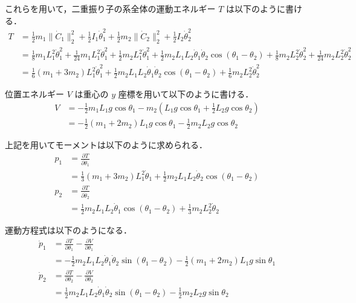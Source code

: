 これらを用いて，二重振り子の系全体の運動エネルギー $T$ は以下のように書ける．
\begin{align}
    T
     & = \frac{1}{2} m_1 \|\dot{C}_1\|_2^2
    + \frac{1}{2} I_1 \dot{\theta}_1^2
    + \frac{1}{2} m_2 \|\dot{C}_2\|_2^2
    + \frac{1}{2} I_2 \dot{\theta}_2^2
    \\
     & = \frac{1}{8} m_1 L_1^2 \dot{\theta}_1^2
    + \frac{1}{24} m_1 L_1^2 \dot{\theta}_1^2
    + \frac{1}{2} m_2 L_1^2 \dot{\theta}_1^2
    + \frac{1}{2} m_2 L_1 L_2 \dot{\theta}_1 \dot{\theta}_2 \cos(\theta_1 - \theta_2)
    + \frac{1}{8} m_2 L_2^2 \dot{\theta}_2^2
    + \frac{1}{24} m_2 L_2^2 \dot{\theta}_2^2
    \\
     & = \frac{1}{6} \left(m_1 + 3 m_2\right) L_1^2 \dot{\theta}_1^2
    + \frac{1}{2} m_2 L_1 L_2 \dot{\theta}_1 \dot{\theta}_2 \cos(\theta_1 - \theta_2)
    + \frac{1}{6} m_2 L_2^2 \dot{\theta}_2^2
\end{align}

位置エネルギー $V$ は重心の $y$ 座標を用いて以下のように書ける．
\begin{align}
    V
     & =
    -\frac{1}{2} m_1 L_1 g \cos\theta_1
    - m_2 \left(L_1 g \cos\theta_1 + \frac{1}{2} L_2 g \cos\theta_2 \right)
    \\
     & =
    -\frac{1}{2} \left(m_1 + 2 m_2 \right) L_1 g \cos\theta_1
    - \frac{1}{2} m_2 L_2 g \cos\theta_2
\end{align}

上記を用いてモーメントは以下のように求められる．
\begin{align}
    p_1
     & = \frac{\partial T}{\partial \dot{\theta}_1}
    \\
     & = \frac{1}{3} \left(m_1 + 3 m_2 \right) L_1^2 \dot{\theta}_1
    + \frac{1}{2} m_2 L_1 L_2 \dot{\theta}_2 \cos(\theta_1 - \theta_2)
    \\
    p_2
     & = \frac{\partial T}{\partial \dot{\theta}_2}
    \\
     & = \frac{1}{2} m_2 L_1 L_2 \dot{\theta}_1 \cos(\theta_1 - \theta_2)
    + \frac{1}{3} m_2 L_2^2 \dot{\theta}_2
\end{align}

運動方程式は以下のようになる．
\begin{align}
    \dot{p}_1
     & = \frac{\partial T}{\partial \theta_1} - \frac{\partial V}{\partial \theta_1}
    \\
     & = - \frac{1}{2} m_2 L_1 L_2 \dot{\theta}_1 \dot{\theta}_2 \sin(\theta_1 - \theta_2)
    - \frac{1}{2} \left(m_1 + 2 m_2 \right) L_1 g \sin\theta_1
    \\
    \dot{p}_2
     & = \frac{\partial T}{\partial \theta_2} - \frac{\partial V}{\partial \theta_2}
    \\
     & = \frac{1}{2} m_2 L_1 L_2 \dot{\theta}_1 \dot{\theta}_2 \sin(\theta_1 - \theta_2)
    - \frac{1}{2} m_2 L_2 g \sin\theta_2
\end{align}
